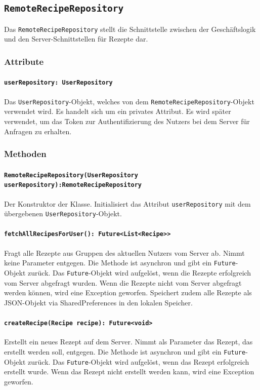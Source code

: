 \documentclass{entwurfsheft}
\begin{document}
\subsection{\texttt{RemoteRecipeRepository}}\label{sec:RemoteRecipeRepository}
Das \texttt{RemoteRecipeRepository} stellt die Schnittstelle zwischen der Geschäftslogik und den Server-Schnittstellen für Rezepte dar.
\subsubsection*{Attribute}
\paragraph{\texttt{userRepository: UserRepository}}
Das \texttt{UserRepository}-Objekt, welches von dem \texttt{Remote\-Recipe\-Repository}-Objekt verwendet wird. Es handelt sich um ein privates Attribut. Es wird später verwendet, um das Token zur Authentifizierung des Nutzers bei dem Server für Anfragen zu erhalten.
\subsubsection*{Methoden}
\paragraph{\texttt{RemoteRecipeRepository(UserRepository userRepository):RemoteRecipeRepository\\}}
Der Konstruktor der Klasse. Initialisiert das Attribut \texttt{userRepository} mit dem übergebenen \texttt{UserRepository}-Objekt.
\paragraph{\texttt{fetchAllRecipesForUser(): Future<List<Recipe>>}}
Fragt alle Rezepte aus Gruppen des aktuellen Nutzers vom Server ab. Nimmt keine Parameter entgegen. Die Methode ist asynchron und gibt ein \texttt{Future}-Objekt zurück. Das \texttt{Future}-Objekt wird aufgelöst, wenn die Rezepte erfolgreich vom Server abgefragt wurden. Wenn die Rezepte nicht vom Server abgefragt werden können, wird eine Exception geworfen. Speichert zudem alle Rezepte als JSON-Objekt via \Gls{SharedPreferences} in den lokalen Speicher.
\paragraph{\texttt{createRecipe(Recipe recipe): Future<void>}}
Erstellt ein neues Rezept auf dem Server. Nimmt als Parameter das Rezept, das erstellt werden soll, entgegen. Die Methode ist asynchron und gibt ein \texttt{Future}-Objekt zurück. Das \texttt{Future}-Objekt wird aufgelöst, wenn das Rezept erfolgreich erstellt wurde. Wenn das Rezept nicht erstellt werden kann, wird eine Exception geworfen.
\end{document}
